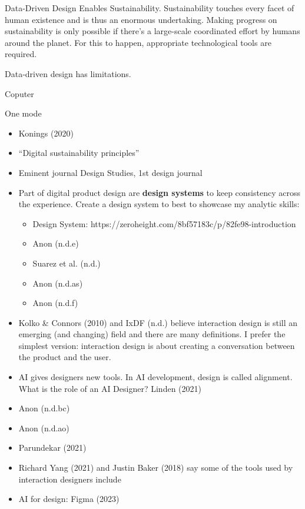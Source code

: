 \documentclass[
  letterpaper,
  DIV=11,
  numbers=noendperiod]{scrartcl}
\providecommand{\tightlist}{%
  \setlength{\itemsep}{0pt}\setlength{\parskip}{0pt}}\usepackage{longtable,booktabs,array}
\begin{document}
Data-Driven Design Enables Sustainability. Sustainability touches every
facet of human existence and is thus an enormous undertaking. Making
progress on sustainability is only possible if there's a large-scale
coordinated effort by humans around the planet. For this to happen,
appropriate technological tools are required.

Data-driven design has limitations.

Coputer

One mode

\begin{itemize}
\tightlist
\item
  Konings (2020)
\item
  ``Digital sustainability principles''
\item
  Eminent journal Design Studies, 1st design journal
\item
  Part of digital product design are \textbf{design systems} to keep
  consistency across the experience. Create a design system to best to
  showcase my analytic skills:

  \begin{itemize}
  \tightlist
  \item
    Design System:
    https://zeroheight.com/8bf57183c/p/82fe98-introduction
  \item
    Anon (n.d.e)
  \item
    Suarez et al. (n.d.)
  \item
    Anon (n.d.as)
  \item
    Anon (n.d.f)
  \end{itemize}
\item
  Kolko \& Connors (2010) and IxDF (n.d.) believe interaction design is
  still an emerging (and changing) field and there are many definitions.
  I prefer the simplest version: interaction design is about creating a
  conversation between the product and the user.
\item
  AI gives designers new tools. In AI development, design is called
  alignment. What is the role of an AI Designer? Linden (2021)
\item
  Anon (n.d.bc)
\item
  Anon (n.d.ao)
\item
  Parundekar (2021)
\item
  Richard Yang (2021) and Justin Baker (2018) say some of the tools used
  by interaction designers include
\item
  AI for design: Figma (2023)
\end{itemize}
\end{document}
